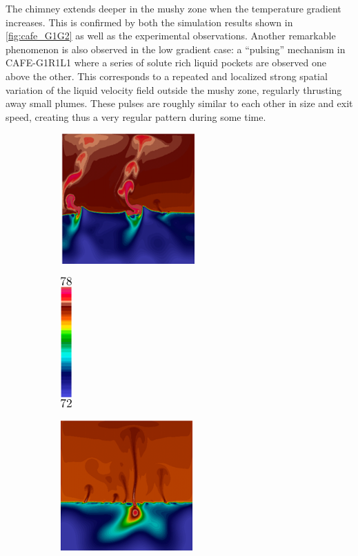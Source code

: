 The chimney extends deeper in the mushy zone when the temperature gradient increases. 
This is confirmed by both the simulation results shown in \cref{fig:cafe_G1G2} as well as the experimental observations. 
Another remarkable phenomenon is also observed in the low gradient case: a “pulsing” mechanism in CAFE-G1R1L1 
where a series of solute rich liquid pockets are observed one above the other. This corresponds to a repeated
and localized strong spatial variation of the liquid velocity field outside the mushy zone, regularly thrusting 
away small plumes. These pulses are roughly similar to each other in size and exit speed, creating thus a very 
regular pattern during some time. 
%
\begin{figure}[htbp]
\centering
  \begin{subfigure}{0.4\textwidth}
    \centering
	\includegraphics[height=5cm]{Chapter3/Graphics/freckle_cafe/cafe_VG1_composition.png}
	\caption{}
    \label{fig:cafe_VG1}
  \end{subfigure}
  \begin{subfigure}{0.01\textwidth}
    \centering
	\includegraphics[height=5cm]{Chapter3/Graphics/freckle_cafe/cafe_VG_colorbar_annot.png}
    \label{} %
  \end{subfigure}
  \hspace{2mm}
   \begin{subfigure}{0.4\textwidth}
    \centering
	\includegraphics[height=5cm]{Chapter3/Graphics/freckle_cafe/cafe_VG2_composition.png}

\end{subfigure}
\end{figure}
